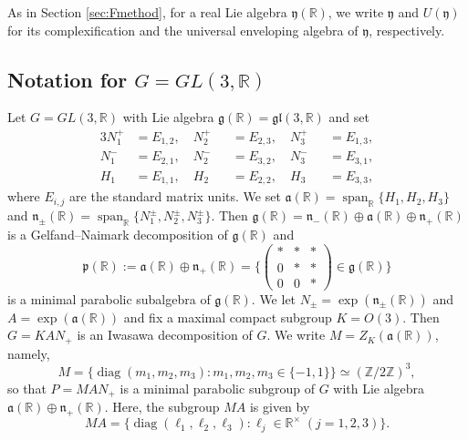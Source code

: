 \documentclass[a4paper,11pt,reqno]{amsart}
\newcommand{\fraka}{\mathfrak{a}}
\newcommand{\frakg}{\mathfrak{g}}
\newcommand{\frakn}{\mathfrak{n}}
\newcommand{\frakp}{\mathfrak{p}}
\newcommand{\RR}{\mathbb{R}}
\newcommand{\0}{{\bf 0}}
\newcommand{\Z}{\mathbb{Z}}
\newcommand{\R}{\mathbb{R}}
\newcommand{\1}{{\bf 1}}
\DeclareMathOperator{\Span}{span}
\DeclareMathOperator{\diag}{diag}
\newcommand{\fraky}{{\mathfrak y}}
\theoremstyle{plain}
\theoremstyle{definition}
\numberwithin{equation}{section}
\theoremstyle{definition}
\begin{document}
As in Section \ref{sec:Fmethod},
for a real Lie algebra $\mathfrak{y}(\R)$, we write $\mathfrak{y}$
and $U(\mathfrak{y})$ for its complexification and the universal enveloping algebra of $\fraky$, respectively. 

\subsection{Notation for \texorpdfstring{$G=GL(3,\RR)$}{G=GL(3,R)}}
\label{sec:notation}

Let $G=GL(3,\RR)$ with Lie algebra $\mathfrak{g}(\RR)=\mathfrak{gl}(3,\RR)$ and set 
\begin{alignat}{3}
   N_1^+&=E_{1,2}, \quad 
    N_2^+&&=E_{2,3}, \quad  N_3^+&&=E_{1,3},\label{eqn:N+}\\[3pt]
   N_1^-&=E_{2,1}, \quad N_2^-&&=E_{3,2}, \quad  N_3^-&&=E_{3,1},\nonumber\\[3pt]
H_1&=E_{1,1}, \quad H_2&&=E_{2,2}, \quad  H_3&&=E_{3,3},\nonumber
\end{alignat}
where $E_{i,j}$ are the standard matrix units. We set $\fraka(\RR)=\Span_\RR\{H_1, H_2, H_3\}$ and $\frakn_\pm(\RR)=\Span_\RR\{N_1^\pm,N_2^\pm,N_3^\pm\}$.  Then $\frakg(\RR)=\frakn_-(\RR)\oplus \fraka(\RR)\oplus\frakn_+(\RR)$ is a Gelfand--Naimark decomposition of $\frakg(\RR)$ and 
\begin{equation}\label{eqn:minimal_parabolic}
\frakp(\RR):=\fraka(\RR)\oplus\frakn_+(\RR)
= \big\{
\begin{pmatrix} 
* & * & * \\
0 & * & * \\
0 & 0 & *
\end{pmatrix}\in \frakg(\RR)\big\}
\end{equation}
 is a minimal parabolic subalgebra of $\frakg(\RR)$. We let $N_\pm =\exp(\frakn_\pm(\RR))$ and $A=\exp(\fraka(\RR))$ and fix a maximal compact subgroup $K=O(3)$. Then $G=KAN_+$ is an Iwasawa decomposition of $G$. 
We write $M=Z_K(\fraka(\RR))$, namely,
\[
M=\big\{\diag(m_1,m_2,m_3) :  m_1,m_2,m_3\in \{-1,1\}\big\} \simeq (\Z/2\Z)^3,
\]
so that $P=MAN_+$ is a minimal parabolic subgroup of $G$ with Lie algebra $\fraka(\RR)\oplus\frakn_+(\RR)$. Here, the subgroup $MA$ is given by
\begin{equation*}
MA=\{\diag(\ell_1,\ell_2,\ell_3): \ell_j \in \R^{\times} \; (j=1,2,3)\}.
\end{equation*}
\end{document}
